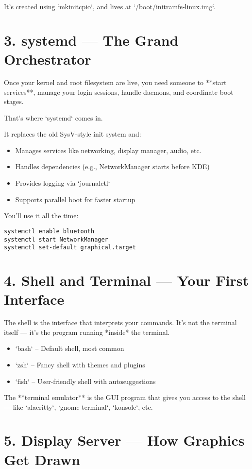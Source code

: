 \documentclass[12pt,openany]{book}
\begin{document}
It's created using `mkinitcpio`, and lives at `/boot/initramfs-linux.img`.

\section{3. systemd — The Grand Orchestrator}

Once your kernel and root filesystem are live, you need someone to **start services**, manage your login sessions, handle daemons, and coordinate boot stages.

That’s where `systemd` comes in.

It replaces the old SysV-style init system and:
\begin{itemize}
  \item Manages services like networking, display manager, audio, etc.
  \item Handles dependencies (e.g., NetworkManager starts before KDE)
  \item Provides logging via `journalctl`
  \item Supports parallel boot for faster startup
\end{itemize}

You’ll use it all the time:
\begin{lstlisting}
systemctl enable bluetooth
systemctl start NetworkManager
systemctl set-default graphical.target
\end{lstlisting}

\section{4. Shell and Terminal — Your First Interface}

The shell is the interface that interprets your commands. It’s not the terminal itself — it’s the program running *inside* the terminal.

\begin{itemize}
  \item `bash` – Default shell, most common
  \item `zsh` – Fancy shell with themes and plugins
  \item `fish` – User-friendly shell with autosuggestions
\end{itemize}

The **terminal emulator** is the GUI program that gives you access to the shell — like `alacritty`, `gnome-terminal`, `konsole`, etc.

\section{5. Display Server — How Graphics Get Drawn}
\end{document}
